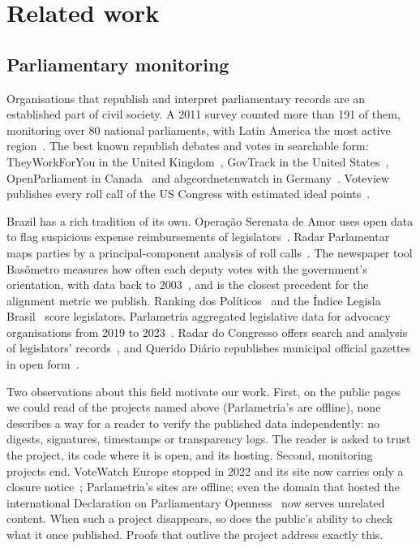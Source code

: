 \section{Related work}
\label{sec:related}

\subsection{Parliamentary monitoring}

Organisations that republish and interpret parliamentary records are an established part of civil society. A 2011 survey counted more than 191 of them, monitoring over 80 national parliaments, with Latin America the most active region~\citep{mandelbaum2011strengthening}. The best known republish debates and votes in searchable form: TheyWorkForYou in the United Kingdom~\citep{mysociety_twfy}, GovTrack in the United States~\citep{govtrack_about}, OpenParliament in Canada~\citep{openparliament_about} and abgeordnetenwatch in Germany~\citep{abgeordnetenwatch_about}. Voteview publishes every roll call of the US Congress with estimated ideal points~\citep{voteview_about}.

Brazil has a rich tradition of its own. Opera\c{c}\~ao Serenata de Amor uses open data to flag suspicious expense reimbursements of legislators~\citep{serenata2016,coutinho2021public}. Radar Parlamentar maps parties by a principal-component analysis of roll calls~\citep{leite2016analise}. The newspaper tool Bas\^ometro measures how often each deputy votes with the government's orientation, with data back to 2003~\citep{estadao_basometro}, and is the closest precedent for the alignment metric we publish. Ranking dos Pol\'iticos~\citep{rankingpoliticos2026criterios} and the \'Indice Legisla Brasil~\citep{legislabrasil2025relatorio} score legislators. Parlametria aggregated legislative data for advocacy organisations from 2019 to 2023~\citep{okbr_parlametria}. Radar do Congresso offers search and analysis of legislators' records~\citep{congressoemfoco_radar}, and Querido Di\'ario republishes municipal official gazettes in open form~\citep{okbr_queridodiario}.

Two observations about this field motivate our work. First, on the public pages we could read of the projects named above (Parlametria's are offline), none describes a way for a reader to verify the published data independently: no digests, signatures, timestamps or transparency logs. The reader is asked to trust the project, its code where it is open, and its hosting. Second, monitoring projects end. VoteWatch Europe stopped in 2022 and its site now carries only a closure notice~\citep{votewatch_closure}; Parlametria's sites are offline; even the domain that hosted the international Declaration on Parliamentary Openness~\citep{openingparliament2012declaration} now serves unrelated content. When such a project disappears, so does the public's ability to check what it once published. Proofs that outlive the project address exactly this.


